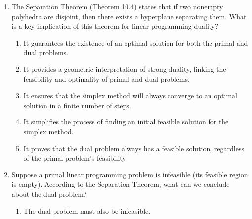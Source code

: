 \documentclass{article}%
\begin{document}
\begin{enumerate}
\begin{enumerate}%
\item The Separation Theorem is unrelated to strong duality.%
\item The Separation Theorem provides a geometric interpretation of strong duality; if the primal and dual problems have optimal solutions, their optimal objective values are equal, and this equality can be visualized through a separating hyperplane.%
\item The Separation Theorem proves strong duality; it directly demonstrates the equality of optimal objective values in primal and dual problems.%
\item The Separation Theorem is a special case of strong duality, applying only to problems with specific constraint structures.%
\item The Separation Theorem contradicts strong duality; it shows that there are cases where the primal and dual problems have different optimal objective values.%
\end{enumerate}%
\vspace{1em}%
\item The Separation Theorem (Theorem 10.4) states that if two nonempty polyhedra are disjoint, then there exists a hyperplane separating them.  What is a key implication of this theorem for linear programming duality?%
\begin{enumerate}%
\item It guarantees the existence of an optimal solution for both the primal and dual problems.%
\item It provides a geometric interpretation of strong duality, linking the feasibility and optimality of primal and dual problems.%
\item It ensures that the simplex method will always converge to an optimal solution in a finite number of steps.%
\item It simplifies the process of finding an initial feasible solution for the simplex method.%
\item It proves that the dual problem always has a feasible solution, regardless of the primal problem's feasibility.%
\end{enumerate}%
\vspace{1em}%
\item Suppose a primal linear programming problem is infeasible (its feasible region is empty).  According to the Separation Theorem, what can we conclude about the dual problem?%
\begin{enumerate}%
\item The dual problem must also be infeasible.%

\end{enumerate}
\end{enumerate}
\end{document}
